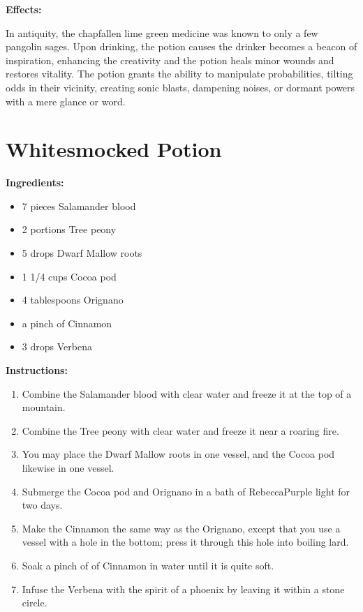 \documentclass{article}
\begin{document}
\textbf{Effects:}

In antiquity, the chapfallen lime green medicine was known to only a few pangolin sages. Upon drinking, the potion causes the drinker becomes a beacon of inspiration, enhancing the creativity and the potion heals minor wounds and restores vitality. The potion grants the ability to manipulate probabilities, tilting odds in their vicinity, creating sonic blasts, dampening noises, or dormant powers with a mere glance or word.

\newpage
\section*{Whitesmocked Potion}

\textbf{Ingredients:}

\begin{itemize}
  \item 7 pieces Salamander blood
  \item 2 portions Tree peony
  \item 5 drops Dwarf Mallow roots
  \item 1 1/4 cups Cocoa pod
  \item 4 tablespoons Orignano
  \item a pinch of Cinnamon
  \item 3 drops Verbena
\end{itemize}

\textbf{Instructions:}

\begin{enumerate}
  \item Combine the Salamander blood with clear water and freeze it at the top of a mountain.
  \item Combine the Tree peony with clear water and freeze it near a roaring fire.
  \item You may place the Dwarf Mallow roots in one vessel, and the Cocoa pod likewise in one vessel.
  \item Submerge the Cocoa pod and Orignano in a bath of RebeccaPurple light for two days.
  \item Make the Cinnamon the same way as the Orignano, except that you use a vessel with a hole in the bottom; press it through this hole into boiling lard.
  \item Soak a pinch of of Cinnamon in water until it is quite soft.
  \item Infuse the Verbena with the spirit of a phoenix by leaving it within a stone circle.
\end{enumerate}
\end{document}
